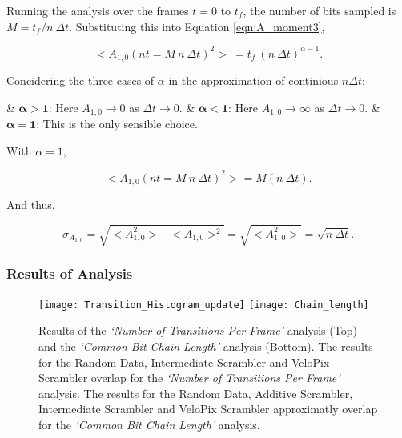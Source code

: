 \begin{description}
					Running the analysis over the frames $t = 0$ to $t_f$, the number of bits sampled is $M = {t_f / n\ \Delta t}$. Substituting this into Equation \ref{eqn:A_moment3},

					\begin{equation}
						<A_{1,0}(nt = M\ n\ \Delta t)^2>\ = t_f\ (n\ \Delta t)^{\alpha -1}.
					\end{equation}

					Concidering the three cases of $\alpha$ in the approximation of continious $n \Delta t$:
					
					\vspace{1em}

					\begin{easylist}[itemize]
						& $\bm{\alpha > 1}$: Here $A_{1,0} \to 0$ as $\Delta t \to 0$.
						& $\bm{\alpha < 1}$: Here $A_{1,0} \to \infty$ as $\Delta t \to 0$.
						& $\bm{\alpha = 1}$: This is the only sensible choice.
					\end{easylist}
					
					\vspace{1em}

					With $\alpha =1$,

					\begin{equation}
						<A_{1,0}(nt = M\ n\ \Delta t)^2> = M (n\ \Delta t).
					\end{equation}

					And thus,

					\begin{equation}
						\sigma_{A_{1,0}} = \sqrt{<A_{1,0}^2> - <A_{1,0}>^2} = \sqrt{<A_{1,0}^2>} = \sqrt{n\ \Delta t}.
					\end{equation}

			\end{description}	

		\subsubsection{Results of Analysis}
		\label{subsub:algorithm_results}
			\vspace{-7mm}
			\begin{figure}[h]
				\centering
				\texttt{[image: Transition\_Histogram\_update]}
				\texttt{[image: Chain\_length]}
				\caption{Results of the \textit{`Number of Transitions Per Frame'} analysis (Top) and the \textit{`Common Bit Chain Length'} analysis (Bottom). The results for the Random Data, Intermediate Scrambler and VeloPix Scrambler overlap for the \textit{`Number of Transitions Per Frame'} analysis. The results for the Random Data, Additive Scrambler, Intermediate Scrambler and VeloPix Scrambler approximatly overlap for the \textit{`Common Bit Chain Length'} analysis.}
				\label{fig:transitions_per_frame}
			\end{figure} \FloatBarrier
			
